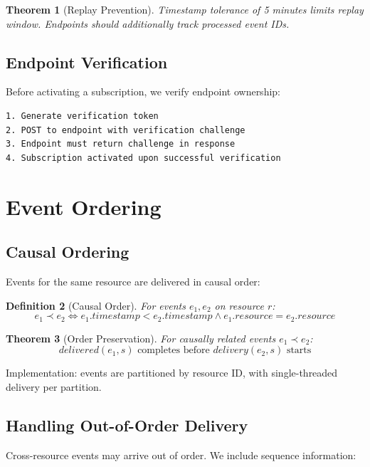 \documentclass[11pt,a4paper]{article}
\newtheorem{theorem}{Theorem}[section]
\newtheorem{definition}[theorem]{Definition}
\begin{document}
\begin{theorem}[Replay Prevention]
Timestamp tolerance of 5 minutes limits replay window. Endpoints should additionally track processed event IDs.
\end{theorem}

\subsection{Endpoint Verification}

Before activating a subscription, we verify endpoint ownership:

\begin{lstlisting}[caption=Endpoint Verification Flow]
1. Generate verification token
2. POST to endpoint with verification challenge
3. Endpoint must return challenge in response
4. Subscription activated upon successful verification
\end{lstlisting}

\section{Event Ordering}

\subsection{Causal Ordering}

Events for the same resource are delivered in causal order:

\begin{definition}[Causal Order]
For events $e_1, e_2$ on resource $r$:
\[
e_1 \prec e_2 \iff e_1.timestamp < e_2.timestamp \land e_1.resource = e_2.resource
\]
\end{definition}

\begin{theorem}[Order Preservation]
For causally related events $e_1 \prec e_2$:
\[
delivered(e_1, s) \text{ completes before } delivery(e_2, s) \text{ starts}
\]
\end{theorem}

Implementation: events are partitioned by resource ID, with single-threaded delivery per partition.

\subsection{Handling Out-of-Order Delivery}

Cross-resource events may arrive out of order. We include sequence information:
\end{document}
